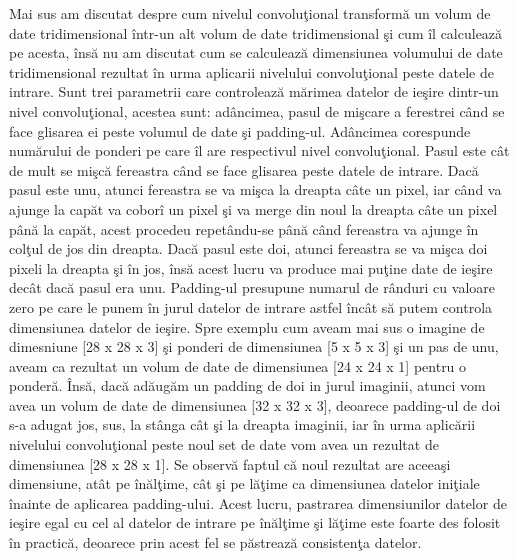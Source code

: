 \par

Mai sus am discutat despre cum nivelul convolu\c{t}ional transform\u{a} un volum de date tridimensional \^{i}ntr-un alt volum de date tridimensional \c{s}i cum \^{i}l calculeaz\u{a} pe acesta, \^{i}ns\u{a} nu am discutat cum se calculeaz\u{a} dimensiunea volumului de date tridimensional rezultat \^{i}n urma aplicarii nivelului convolu\c{t}ional peste  datele de intrare. Sunt trei parametrii care controleaz\u{a} m\u{a}rimea datelor de ie\c{s}ire dintr-un nivel convolu\c{t}ional, acestea sunt: ad\^{a}ncimea, pasul de mi\c{s}care a ferestrei c\^{a}nd se face glisarea ei peste volumul de date \c{s}i padding-ul. Ad\^{a}ncimea corespunde num\u{a}rului de ponderi pe care \^{i}l are respectivul nivel convolu\c{t}ional. Pasul este c\^{a}t de mult se mi\c{s}c\u{a} fereastra c\^{a}nd se face glisarea peste datele de intrare. Dac\u{a} pasul este unu, atunci fereastra se va mi\c{s}ca la dreapta c\^{a}te un pixel, iar c\^{a}nd va ajunge la cap\u{a}t va cobor\^{i} un pixel \c{s}i va merge din noul la dreapta c\^{a}te un pixel p\^{a}n\u{a} la cap\u{a}t, acest procedeu repet\^{a}ndu-se p\^{a}n\u{a} c\^{a}nd fereastra va ajunge \^{i}n col\c{t}ul de jos din dreapta. Dac\u{a} pasul este doi, atunci fereastra se va mi\c{s}ca doi pixeli la dreapta \c{s}i \^{i}n jos, \^{i}ns\u{a} acest lucru va produce mai pu\c{t}ine date de ie\c{s}ire dec\^{a}t dac\u{a} pasul era unu. Padding-ul presupune numarul de r\^{a}nduri cu valoare zero pe care le punem \^{i}n jurul datelor de intrare astfel \^{i}nc\^{a}t s\u{a} putem controla dimensiunea datelor de ie\c{s}ire. Spre exemplu cum aveam mai sus o imagine de dimesniune [28 x 28 x 3] \c{s}i ponderi de dimensiunea [5 x 5 x 3] \c{s}i un pas de unu, aveam ca rezultat un volum de date de dimensiunea [24 x 24 x 1] pentru o ponder\u{a}. \^{I}ns\u{a}, dac\u{a} ad\u{a}ug\u{a}m un padding de doi in jurul imaginii, atunci vom avea un volum de date de dimensiunea [32 x 32 x 3], deoarece padding-ul de doi s-a adugat jos, sus, la st\^{a}nga c\^{a}t \c{s}i la dreapta imaginii, iar \^{i}n urma aplic\u{a}rii nivelului convolu\c{t}ional peste noul set de date vom avea un rezultat de dimensiunea [28 x 28 x 1]. Se observ\u{a} faptul c\u{a} noul rezultat are aceea\c{s}i dimensiune, at\^{a}t pe \^{i}n\u{a}l\c{t}ime, c\^{a}t \c{s}i pe l\u{a}\c{t}ime ca dimensiunea datelor ini\c{t}iale \^{i}nainte de aplicarea padding-ului. Acest lucru, pastrarea dimensiunilor datelor de ie\c{s}ire egal cu cel al datelor de intrare pe \^{i}n\u{a}l\c{t}ime \c{s}i l\u{a}\c{t}ime este foarte des folosit \^{i}n practic\u{a}, deoarece prin acest fel se p\u{a}streaz\u{a} consisten\c{t}a datelor.

